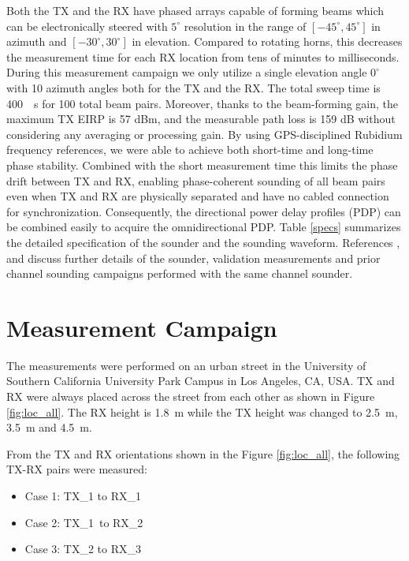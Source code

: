 \documentclass[conference]{IEEEtran}
\begin{document}
Both the TX and the RX have phased arrays capable of forming beams which can be electronically steered with $5^{\circ}$ resolution in the range of $[-45^{\circ}, 45^{\circ}]$ in azimuth and $[-30^{\circ}, 30^{\circ}]$ in elevation. Compared to rotating horns, this decreases the measurement time for each RX location from tens of minutes to milliseconds. During this measurement campaign we only utilize a single elevation angle $0^{\circ}$ with 10 azimuth angles both for the TX and the RX. The total sweep time is \SI{400}{\mu s} for 100 total beam pairs. Moreover, thanks to the beam-forming gain, the maximum TX EIRP is 57 dBm, and the measurable path loss is 159 dB without considering any averaging or processing gain. By using GPS-disciplined Rubidium frequency references, we were able to achieve both short-time and long-time phase stability. Combined with the short measurement time this limits the phase drift between TX and RX, enabling phase-coherent sounding of all beam pairs even when TX and RX are physically separated and have no cabled connection for synchronization. Consequently, the directional power delay profiles (PDP) can be combined easily to acquire the omnidirectional PDP. Table \ref{specs} summarizes the detailed specification of the sounder and the sounding waveform. References \cite{bas_2017_realtime}, \cite{bas_2017_microcell} and \cite{wang_2017_stationarity} discuss further details of the sounder, validation measurements and prior channel sounding campaigns performed with the same channel sounder. 




\section{Measurement Campaign} \label{sec_meas}

The measurements were performed on an urban street in the University of Southern California University Park Campus in Los Angeles, CA, USA. TX and RX were always placed across the street from each other as shown in Figure \ref{fig:loc_all}. The RX height is \SI{1.8}{m} while the TX height was changed to \SI{2.5}{m}, \SI{3.5}{m} and \SI{4.5}{m}. 

From the TX and RX orientations shown in the Figure \ref{fig:loc_all}, the following TX-RX pairs were measured:
\begin{itemize}
  \item Case 1: TX\_1 to RX\_1
  \item Case 2: TX\_1\ to RX\_2
  \item Case 3: TX\_2 to RX\_3
\end{itemize}
\end{document}
